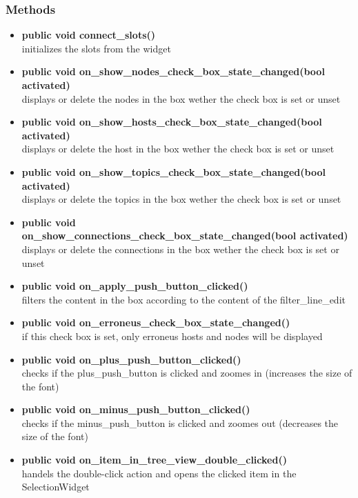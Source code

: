 \subsubsection{Methods}
\begin{itemize}
  \item \textbf{public void connect\_slots()}\\
  initializes the slots from the widget
  \item \textbf{public void on\_show\_nodes\_check\_box\_state\_changed(bool activated)}\\
  displays or delete the nodes in the box wether the check box is set or unset
  \item \textbf{public void on\_show\_hosts\_check\_box\_state\_changed(bool activated)}\\
  displays or delete the host in the box wether the check box is set or unset
  \item \textbf{public void on\_show\_topics\_check\_box\_state\_changed(bool activated)}\\
  displays or delete the topics in the box wether the check box is set or unset
  \item \textbf{public void
  on\_show\_connections\_check\_box\_state\_changed(bool activated)}\\
  displays or delete the connections in the box wether the check box is set or
  unset
  \item \textbf{public void on\_apply\_push\_button\_clicked()}\\
  filters the content in the box according to the content of the
  filter\_line\_edit
  \item \textbf{public void on\_erroneus\_check\_box\_state\_changed()}\\
  if this check box is set, only erroneus hosts and nodes will be displayed  
  \item \textbf{public void on\_plus\_push\_button\_clicked()}\\
  checks if the plus\_push\_button is clicked and zoomes in (increases the size
  of the font)
  \item \textbf{public void on\_minus\_push\_button\_clicked()}\\
  checks if the minus\_push\_button is clicked and zoomes out (decreases the
  size of the font)
  \item \textbf{public void on\_item\_in\_tree\_view\_double\_clicked()}\\
  handels the double-click action and opens the clicked item in the SelectionWidget
\end{itemize}

